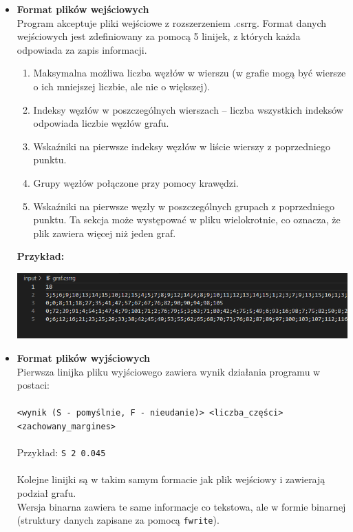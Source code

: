 \documentclass{article}
\begin{document}
    \begin{itemize}
    
        \item \textbf{Format plików wejściowych} \\
        Program akceptuje pliki wejściowe z rozszerzeniem .csrrg. Format danych wejściowych jest zdefiniowany za pomocą 5 linijek, z których każda odpowiada za zapis informacji.
        \begin{enumerate}[label=\arabic*.] %
            \item Maksymalna możliwa liczba węzłów w wierszu (w grafie mogą być wiersze o ich mniejszej liczbie, ale nie o większej).
            \item Indeksy węzłów w poszczególnych wierszach – liczba wszystkich indeksów odpowiada liczbie węzłów grafu.
            \item Wskaźniki na pierwsze indeksy węzłów w liście wierszy z poprzedniego punktu.
            \item Grupy węzłów połączone przy pomocy krawędzi.
            \item Wskaźniki na pierwsze węzły w poszczególnych grupach z poprzedniego punktu. Ta sekcja może występować w pliku wielokrotnie, co oznacza, że plik zawiera więcej niż jeden graf.
        \end{enumerate}
        \textbf{Przykład:}
            \begin{center}
            \includegraphics[width=1\linewidth]{img/grafcsrrg.png}
        \end{center}
    
        \item \textbf{Format plików wyjściowych} \\
    Pierwsza linijka pliku wyjściowego zawiera wynik działania programu w postaci: \\\\
    \texttt{<wynik (S - pomyślnie, F - nieudanie)> <liczba\_części> <zachowany\_margines>} \\\\
    Przykład: \texttt{S 2 0.045} \\\\
    Kolejne linijki są w takim samym formacie jak plik wejściowy i zawierają podział grafu. \\
    Wersja binarna zawiera te same informacje co tekstowa, ale w formie binarnej (struktury danych zapisane za pomocą \texttt{fwrite}).


        
    
    \end{itemize}
\end{document}
